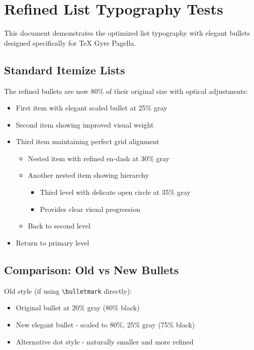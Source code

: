 \documentclass[11pt,a4paper]{article}
\begin{document}
\section{Refined List Typography Tests}

This document demonstrates the optimized list typography with elegant bullets designed specifically for TeX Gyre Pagella.

\subsection{Standard Itemize Lists}

The refined bullets are now 80\% of their original size with optical adjustments:
\begin{itemize}
\item First item with elegant scaled bullet at 25\% gray
\item Second item showing improved visual weight
\item Third item maintaining perfect grid alignment
  \begin{itemize}
  \item Nested item with refined en-dash at 30\% gray
  \item Another nested item showing hierarchy
    \begin{itemize}
    \item Third level with delicate open circle at 35\% gray
    \item Provides clear visual progression
    \end{itemize}
  \item Back to second level
  \end{itemize}
\item Return to primary level
\end{itemize}

\subsection{Comparison: Old vs New Bullets}

Old style (if using \texttt{\textbackslash bulletmark} directly):
\begin{itemize}
\item[{\textcolor[gray]{0.25}{\textbullet}}] Original bullet at 20\% gray (80\% black)
\item[{\textcolor[gray]{0.45}{\raisebox{0.1ex}{\scalebox{0.75}{$\bullet$}}}}] New elegant bullet - scaled to 80\%, 25\% gray (75\% black)
\item[{\textcolor[gray]{0.45}{\raisebox{0.15ex}{\scalebox{0.65}{\textbullet}}}}] Alternative dot style - naturally smaller and more refined
\end{itemize}
\end{document}
